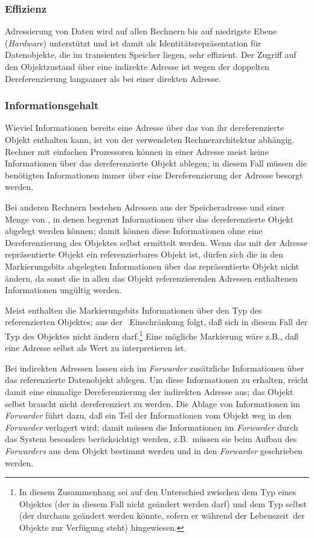 \subsubsection{Effizienz}
%
Adressierung von Daten wird auf allen Rechnern bis auf niedrigste
Ebene ({\em Hardware\/}) unterst\"{u}tzt und ist damit als
Identit\"{a}tsrepr\"{a}sentation f\"{u}r Datenobjekte, die im transienten
Speicher liegen, sehr effizient. Der Zugriff auf den Objektzustand
\"{u}ber eine indirekte Adresse ist wegen der doppelten Dereferenzierung
langsamer als bei einer direkten Adresse.
%
\subsubsection{Informationsgehalt}
%
Wieviel Informationen bereits eine Adresse \"{u}ber das von ihr
dereferenzierte Objekt enthalten kann, ist von der verwendeten
Rechnerarchitektur abh\"{a}ngig. Rechner mit einfachen Prozessoren
k\"{o}nnen in einer Adresse meist keine Informationen \"{u}ber das
dereferenzierte Objekt ablegen; in diesem Fall m\"{u}ssen die ben\"{o}tigten
Informationen immer \"{u}ber eine Dereferenzierung der Adresse besorgt
werden.
%
\par{}Bei anderen Rechnern bestehen Adressen aus
der Speicheradresse und einer Menge von
, in denen begrenzt Informationen
\"{u}ber das dereferenzierte Objekt abgelegt werden k\"{o}nnen; damit
k\"{o}nnen diese Informationen ohne eine Dereferenzierung des Objektes
selbst ermittelt werden. Wenn das mit der Adresse repr\"{a}sentierte
Objekt ein referenzierbares Objekt ist, d\"{u}rfen sich die
in den Markierungsbits abgelegten Informationen \"{u}ber das
repr\"{a}sentierte Objekt nicht
\"{a}ndern, da sonst die in allen das Objekt referenzierenden Adressen
enthaltenen Informationen ung\"{u}ltig werden.
%
\par{}Meist enthalten die Markierungsbits Informationen \"{u}ber den Typ
des referenzierten Objektes; aus der \og[en]\ Einschr\"{a}nkung
folgt, da\ss{} sich in diesem Fall der Typ des Objektes nicht \"{a}ndern
darf.\footnote{In diesem Zusammenhang sei auf den Unterschied zwischen
dem Typ eines Objektes (der in diesem Fall nicht ge\"{a}ndert werden
darf) und dem Typ selbst (der durchaus ge\"{a}ndert werden k\"{o}nnte,
sofern er w\"{a}hrend der \rglq{}Lebenszeit\rgrq\ der Objekte zur
Verf\"{u}gung steht) hingewiesen.} Eine m\"{o}gliche Markierung w\"{a}re z.B.,
da\ss{} eine Adresse selbst als Wert zu interpretieren ist.
%
\par{}Bei indirekten Adressen lassen sich im {\em Forwarder\/}
zus\"{a}tzliche Informationen \"{u}ber das referenzierte Datenobjekt
ablegen.  Um diese Informationen zu erhalten, reicht damit eine
einmalige Dereferenzierung der indirekten Adresse aus; das Objekt
selbst braucht nicht dereferenziert zu werden. Die Ablage von
Informationen im {\em Forwarder\/} f\"{u}hrt dazu, da\ss{} ein Teil der
Informationen vom Objekt weg in den {\em Forwarder\/} verlagert wird;
damit m\"{u}ssen die Informationen im {\em Forwarder\/} durch das System
besonders ber\"{u}cksichtigt werden, z.B.\ m\"{u}ssen sie beim Aufbau des
{\em Forwarders\/} aus dem Objekt bestimmt werden und in den {\em
Forwarder\/} geschrieben werden.
%

